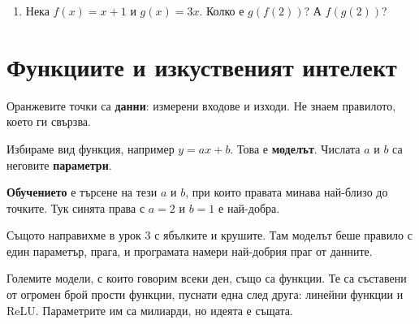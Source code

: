 \documentclass[11pt,a4paper]{article}
\begin{document}
\begin{trybox}
\begin{enumerate}[label=\textbf{\arabic*.},start=19]
  \item Нека $f(x)=x+1$ и $g(x)=3x$. Колко е $g(f(2))$? А $f(g(2))$?
\end{enumerate}
\end{trybox}

\section{Функциите и изкуственият интелект}

\begin{minipage}[c]{0.44\textwidth}
\end{minipage}\hfill
\begin{minipage}[c]{0.52\textwidth}
Оранжевите точки са \textbf{данни}: измерени входове и изходи. Не знаем правилото, което ги свързва.

Избираме вид функция, например $y=ax+b$. Това е \textbf{моделът}. Числата $a$ и $b$ са неговите \textbf{параметри}.

\textbf{Обучението} е търсене на тези $a$ и $b$, при които правата минава най-близо до точките. Тук синята права с $a=2$ и $b=1$ е най-добра.
\end{minipage}

\vspace{4pt}
Същото направихме в урок 3 с ябълките и крушите. Там моделът беше правило с един параметър, прага, и програмата намери най-добрия праг от данните.

Големите модели, с които говорим всеки ден, също са функции. Те са съставени от огромен брой прости функции, пуснати една след друга: линейни функции и ReLU. Параметрите им са милиарди, но идеята е същата.
\end{document}
